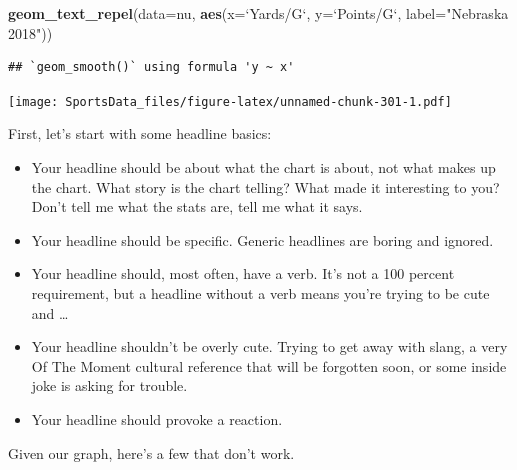 \documentclass[
]{book}
\newenvironment{Shaded}{\begin{snugshade}}{\end{snugshade}}
\newcommand{\DataTypeTok}[1]{\textcolor[rgb]{0.13,0.29,0.53}{#1}}
\newcommand{\KeywordTok}[1]{\textcolor[rgb]{0.13,0.29,0.53}{\textbf{#1}}}
\newcommand{\NormalTok}[1]{#1}
\newcommand{\StringTok}[1]{\textcolor[rgb]{0.31,0.60,0.02}{#1}}
\providecommand{\tightlist}{%
  \setlength{\itemsep}{0pt}\setlength{\parskip}{0pt}}
\begin{document}
\begin{Shaded}
\begin{Highlighting}[]
\StringTok{  }\KeywordTok{geom_text_repel}\NormalTok{(}\DataTypeTok{data=}\NormalTok{nu, }\KeywordTok{aes}\NormalTok{(}\DataTypeTok{x=}\StringTok{`}\DataTypeTok{Yards/G}\StringTok{`}\NormalTok{, }\DataTypeTok{y=}\StringTok{`}\DataTypeTok{Points/G}\StringTok{`}\NormalTok{, }\DataTypeTok{label=}\StringTok{"Nebraska 2018"}\NormalTok{))}
\end{Highlighting}
\end{Shaded}

\begin{verbatim}
## `geom_smooth()` using formula 'y ~ x'
\end{verbatim}

\texttt{[image: SportsData\_files/figure-latex/unnamed-chunk-301-1.pdf]}

First, let's start with some headline basics:

\begin{itemize}
\tightlist
\item
  Your headline should be about what the chart is about, not what makes up the chart. What story is the chart telling? What made it interesting to you? Don't tell me what the stats are, tell me what it says.
\item
  Your headline should be specific. Generic headlines are boring and ignored.
\item
  Your headline should, most often, have a verb. It's not a 100 percent requirement, but a headline without a verb means you're trying to be cute and \ldots{}
\item
  Your headline shouldn't be overly cute. Trying to get away with slang, a very Of The Moment cultural reference that will be forgotten soon, or some inside joke is asking for trouble.
\item
  Your headline should provoke a reaction.
\end{itemize}

Given our graph, here's a few that don't work.
\end{document}

